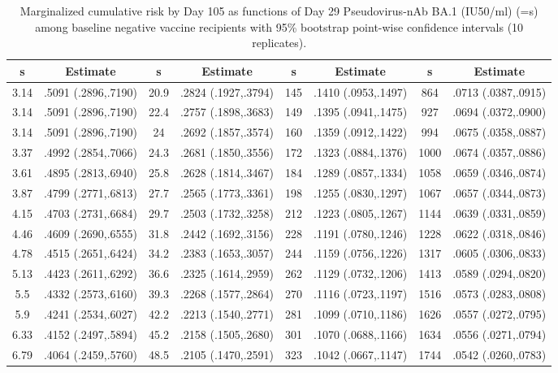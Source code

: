 \begin{longtable}{cccccccc}
\caption{Marginalized cumulative risk by Day 105 as functions of Day 29 Pseudovirus-nAb BA.1 (IU50/ml) (=s) among baseline negative vaccine recipients with 95\% bootstrap point-wise confidence intervals (10 replicates).} \\ 
   \hline  s& Estimate& s& Estimate& s& Estimate& s& Estimate\\ 
\hline
3.14 & .5091 (.2896,.7190) & 20.9 & .2824 (.1927,.3794) & 145 & .1410 (.0953,.1497) & 864 & .0713 (.0387,.0915) \\ 
  3.14 & .5091 (.2896,.7190) & 22.4 & .2757 (.1898,.3683) & 149 & .1395 (.0941,.1475) & 927 & .0694 (.0372,.0900) \\ 
  3.14 & .5091 (.2896,.7190) & 24 & .2692 (.1857,.3574) & 160 & .1359 (.0912,.1422) & 994 & .0675 (.0358,.0887) \\ 
  3.37 & .4992 (.2854,.7066) & 24.3 & .2681 (.1850,.3556) & 172 & .1323 (.0884,.1376) & 1000 & .0674 (.0357,.0886) \\ 
  3.61 & .4895 (.2813,.6940) & 25.8 & .2628 (.1814,.3467) & 184 & .1289 (.0857,.1334) & 1058 & .0659 (.0346,.0874) \\ 
  3.87 & .4799 (.2771,.6813) & 27.7 & .2565 (.1773,.3361) & 198 & .1255 (.0830,.1297) & 1067 & .0657 (.0344,.0873) \\ 
  4.15 & .4703 (.2731,.6684) & 29.7 & .2503 (.1732,.3258) & 212 & .1223 (.0805,.1267) & 1144 & .0639 (.0331,.0859) \\ 
  4.46 & .4609 (.2690,.6555) & 31.8 & .2442 (.1692,.3156) & 228 & .1191 (.0780,.1246) & 1228 & .0622 (.0318,.0846) \\ 
  4.78 & .4515 (.2651,.6424) & 34.2 & .2383 (.1653,.3057) & 244 & .1159 (.0756,.1226) & 1317 & .0605 (.0306,.0833) \\ 
  5.13 & .4423 (.2611,.6292) & 36.6 & .2325 (.1614,.2959) & 262 & .1129 (.0732,.1206) & 1413 & .0589 (.0294,.0820) \\ 
  5.5 & .4332 (.2573,.6160) & 39.3 & .2268 (.1577,.2864) & 270 & .1116 (.0723,.1197) & 1516 & .0573 (.0283,.0808) \\ 
  5.9 & .4241 (.2534,.6027) & 42.2 & .2213 (.1540,.2771) & 281 & .1099 (.0710,.1186) & 1626 & .0557 (.0272,.0795) \\ 
  6.33 & .4152 (.2497,.5894) & 45.2 & .2158 (.1505,.2680) & 301 & .1070 (.0688,.1166) & 1634 & .0556 (.0271,.0794) \\ 
  6.79 & .4064 (.2459,.5760) & 48.5 & .2105 (.1470,.2591) & 323 & .1042 (.0667,.1147) & 1744 & .0542 (.0260,.0783) \\ 

\end{longtable}
